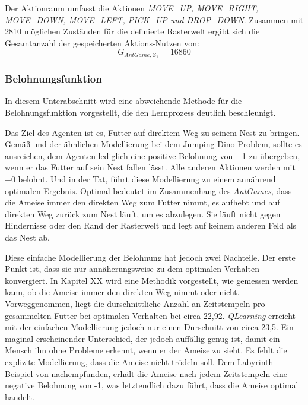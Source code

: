 Der Aktionraum umfasst die Aktionen \textit{MOVE\_UP, MOVE\_RIGHT,
MOVE\_DOWN,
MOVE\_LEFT,
PICK\_UP und
DROP\_DOWN}. Zusammen mit 2810 möglichen Zuständen für die definierte Rasterwelt ergibt sich die Gesamtanzahl der gespeicherten Aktions-Nutzen von:
\begin{equation}
    G_{AntGame,Z_1} = 16860
\end{equation}

\subsubsection{Belohnungsfunktion}
In diesem Unterabschnitt wird eine abweichende Methode für die Belohnungsfunktion vorgestellt, die den Lernprozess deutlich beschleunigt.
\par
Das Ziel des Agenten ist es, Futter auf direktem Weg zu seinem Nest zu bringen. Gemäß \cite{Sutton1998} und der ähnlichen Modellierung bei dem Jumping Dino Problem, sollte es ausreichen, dem Agenten lediglich eine positive Belohnung von +1 zu übergeben, wenn er das Futter auf sein Nest fallen lässt. Alle anderen Aktionen werden mit +0 belohnt. Und in der Tat, führt diese Modellierung zu einem annährend optimalen Ergebnis. \glqq Optimal\grqq{} bedeutet im Zusammenhang des \textit{AntGames}, dass die Ameise immer den direkten Weg zum Futter nimmt, es aufhebt und auf direkten Weg zurück zum Nest läuft, um es abzulegen. Sie läuft nicht gegen Hindernisse oder den Rand der Rasterwelt und legt auf keinem anderen Feld als das Nest ab.
\par
Diese einfache Modellierung der Belohnung hat jedoch zwei Nachteile. Der erste Punkt ist, dass sie nur annäherungsweise zu dem optimalen Verhalten konvergiert. In Kapitel XX wird eine Methodik vorgestellt, wie gemessen werden kann, ob die Ameise immer den direkten Weg nimmt oder nicht. Vorweggenommen, liegt die durschnittliche Anzahl an Zeitstempeln pro gesammelten Futter bei optimalen Verhalten bei circa 22,92. \textit{QLearning} erreicht mit der einfachen Modellierung jedoch nur einen Durschnitt von circa 23,5. Ein maginal erscheinender Unterschied, der jedoch auffällig genug ist, damit ein Mensch ihn ohne Probleme erkennt, wenn er der Ameise zu sieht. Es fehlt die explizite Modellierung, dass die Ameise nicht \glqq trödeln\grqq{} soll. Dem Labyrinth-Beispiel von \cite{Sutton1998} nachempfunden, erhält die Ameise nach jedem Zeitstempeln eine negative Belohnung von -1, was letztendlich dazu führt, dass die Ameise optimal handelt.
\par 
